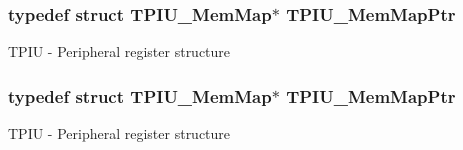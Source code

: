 \subsubsection[{\texorpdfstring{T\+P\+I\+U\+\_\+\+Mem\+Map\+Ptr}{TPIU_MemMapPtr}}]{\setlength{\rightskip}{0pt plus 5cm}typedef struct {\bf T\+P\+I\+U\+\_\+\+Mem\+Map}$\ast$ {\bf T\+P\+I\+U\+\_\+\+Mem\+Map\+Ptr}}\hypertarget{group___t_p_i_u___peripheral_ga300f3eea21a542970734e2c9c0953f4f}{}\label{group___t_p_i_u___peripheral_ga300f3eea21a542970734e2c9c0953f4f}
T\+P\+IU -\/ Peripheral register structure 
\subsubsection[{\texorpdfstring{T\+P\+I\+U\+\_\+\+Mem\+Map\+Ptr}{TPIU_MemMapPtr}}]{\setlength{\rightskip}{0pt plus 5cm}typedef struct {\bf T\+P\+I\+U\+\_\+\+Mem\+Map}$\ast$ {\bf T\+P\+I\+U\+\_\+\+Mem\+Map\+Ptr}}\hypertarget{group___t_p_i_u___peripheral_ga300f3eea21a542970734e2c9c0953f4f}{}\label{group___t_p_i_u___peripheral_ga300f3eea21a542970734e2c9c0953f4f}
T\+P\+IU -\/ Peripheral register structure 